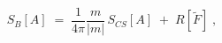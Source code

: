 \begin{equation}
S_{B}[A]\;=\;\frac{1}{4\pi }\frac{m}{\left| m\right| }\,S_{CS}[A]\;+\;R[%
\widetilde{F}]\;,  \label{ab}
\end{equation}


